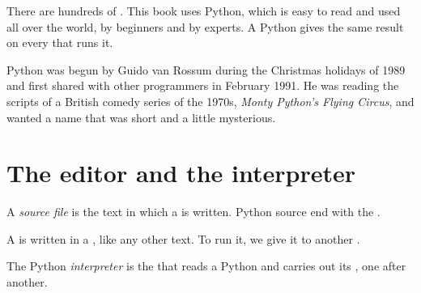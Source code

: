 There are hundreds of . This book uses Python, which is
easy to read and used all over the world, by beginners and by experts. A
Python  gives the same result on every  that runs it.

\begin{history}
Python was begun by Guido van Rossum during the Christmas holidays of 1989 and
first shared with other programmers in February 1991. He was reading the
scripts of a British comedy series of the 1970s, \emph{Monty Python's Flying
Circus}, and wanted a name that was short and a little mysterious.
\end{history}

\section{The editor and the interpreter}

\begin{definition}\label{def:g6:first-python-program:source}
A \emph{source file} is the text  in which a 
is written. Python source  end with the  .
\end{definition}

A  is written in a , like any other text. To run it, we
give it to another .

\begin{definition}[Interpreter]\label{def:g6:first-python-program:interpreter}
The Python \emph{interpreter} is the  that reads a
Python  and carries out its , one after another.
\end{definition}


